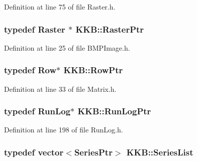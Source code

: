 Definition at line 75 of file Raster.\+h.

\subsubsection[{\texorpdfstring{Raster\+Ptr}{RasterPtr}}]{\setlength{\rightskip}{0pt plus 5cm}typedef {\bf Raster} $\ast$ {\bf K\+K\+B\+::\+Raster\+Ptr}}\hypertarget{namespace_k_k_b_a80d46bd24db644a022c863bce8ae3633}{}\label{namespace_k_k_b_a80d46bd24db644a022c863bce8ae3633}


Definition at line 25 of file B\+M\+P\+Image.\+h.

\subsubsection[{\texorpdfstring{Row\+Ptr}{RowPtr}}]{\setlength{\rightskip}{0pt plus 5cm}typedef {\bf Row}$\ast$ {\bf K\+K\+B\+::\+Row\+Ptr}}\hypertarget{namespace_k_k_b_aac521e443a612a7e8cdda6d5a451e944}{}\label{namespace_k_k_b_aac521e443a612a7e8cdda6d5a451e944}


Definition at line 33 of file Matrix.\+h.

\subsubsection[{\texorpdfstring{Run\+Log\+Ptr}{RunLogPtr}}]{\setlength{\rightskip}{0pt plus 5cm}typedef {\bf Run\+Log}$\ast$ {\bf K\+K\+B\+::\+Run\+Log\+Ptr}}\hypertarget{namespace_k_k_b_a2fe464c953e535e4b50cf3e4527ad22f}{}\label{namespace_k_k_b_a2fe464c953e535e4b50cf3e4527ad22f}


Definition at line 198 of file Run\+Log.\+h.

\subsubsection[{\texorpdfstring{Series\+List}{SeriesList}}]{\setlength{\rightskip}{0pt plus 5cm}typedef vector$<${\bf Series\+Ptr}$>$ {\bf K\+K\+B\+::\+Series\+List}}\hypertarget{namespace_k_k_b_a3f1b2c85e1ffd8e8848130542adf4033}{}\label{namespace_k_k_b_a3f1b2c85e1ffd8e8848130542adf4033}


